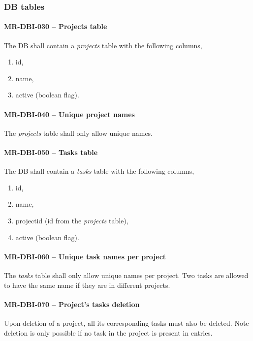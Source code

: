 \subsubsection{DB tables}
\paragraph{MR-DBI-030 -- Projects table}
The \gls{DB} shall contain a \emph{projects} table with the following columns,
\begin{enumerate}
\item id,
\item name,
\item active (boolean flag).
\end{enumerate}

\paragraph{MR-DBI-040 -- Unique project names}
The \emph{projects} table shall only allow unique names.

\paragraph{MR-DBI-050 -- Tasks table}
The \gls{DB} shall contain a \emph{tasks} table with the following columns,
\begin{enumerate}
\item id,
\item name,
\item project\textunderscore id (id from the \emph{projects} table),
\item active (boolean flag).
\end{enumerate}

\paragraph{MR-DBI-060 -- Unique task names per project}
The \emph{tasks} table shall only allow unique names per project.
Two tasks are allowed to have the same name if they are in different
projects.

\paragraph{MR-DBI-070 -- Project's tasks deletion}
Upon deletion of a project, all its corresponding tasks must also
be deleted.
Note deletion is only possible if no task in the project is present
in entries.

